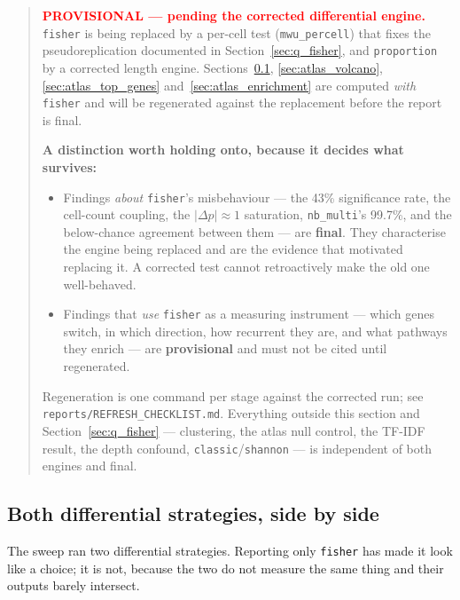\documentclass[11pt,a4paper]{article}
\begin{document}
\begin{quote}
\textbf{\textcolor{red}{PROVISIONAL --- pending the corrected differential
engine.}} \texttt{fisher} is being replaced by a per-cell test
(\texttt{mwu\_percell}) that fixes the pseudoreplication documented in
Section~\ref{sec:q_fisher}, and \texttt{proportion} by a corrected length
engine. Sections~\ref{sec:atlas_diff_strategies}, \ref{sec:atlas_volcano},
\ref{sec:atlas_top_genes} and~\ref{sec:atlas_enrichment} are computed
\emph{with} \texttt{fisher} and will be regenerated against the replacement
before the report is final.

\textbf{A distinction worth holding onto, because it decides what survives:}

\begin{itemize}[nosep]
  \item Findings \emph{about} \texttt{fisher}'s misbehaviour --- the 43\%
    significance rate, the cell-count coupling, the $|\Delta p| \approx 1$
    saturation, \texttt{nb\_multi}'s 99.7\%, and the below-chance agreement
    between them --- are \textbf{final}. They characterise the engine being
    replaced and are the evidence that motivated replacing it. A corrected test
    cannot retroactively make the old one well-behaved.
  \item Findings that \emph{use} \texttt{fisher} as a measuring instrument ---
    which genes switch, in which direction, how recurrent they are, and what
    pathways they enrich --- are \textbf{provisional} and must not be cited
    until regenerated.
\end{itemize}

Regeneration is one command per stage against the corrected run; see
\texttt{reports/REFRESH\_CHECKLIST.md}. Everything outside this section and
Section~\ref{sec:q_fisher} --- clustering, the atlas null control, the TF-IDF
result, the depth confound, \texttt{classic}/\texttt{shannon} --- is independent
of both engines and final.
\end{quote}

\subsection{Both differential strategies, side by side}
\label{sec:atlas_diff_strategies}

The sweep ran two differential strategies. Reporting only \texttt{fisher} has
made it look like a choice; it is not, because the two do not measure the same
thing and their outputs barely intersect.
\end{document}
